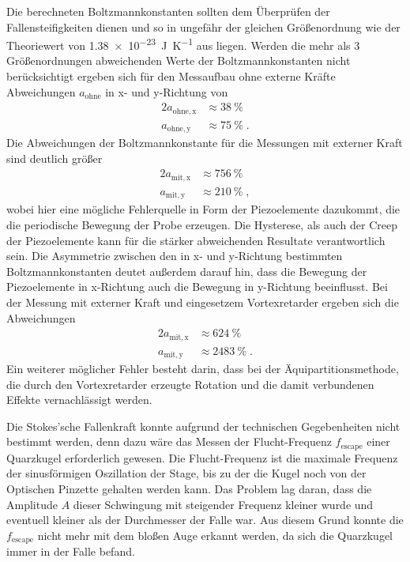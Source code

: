 Die berechneten Boltzmannkonstanten sollten dem Überprüfen der Fallensteifigkeiten dienen und so in ungefähr der gleichen Größenordnung wie der Theoriewert von \qty{1.38e-23}{\joule\per\kelvin} aus \cite{k_b} liegen.
Werden die mehr als 3 Größenordnungen abweichenden Werte der Boltzmannkonstanten nicht berücksichtigt ergeben sich für den Messaufbau ohne externe Kräfte Abweichungen $a_{\mathrm{ohne}}$ in x- und y-Richtung von
\begin{alignat*}{2}
    a_{\mathrm{ohne,x}} &\approx \qty{38}{\%} \\
    a_{\mathrm{ohne,y}} &\approx \qty{75}{\%} \;.
\end{alignat*}
Die Abweichungen der Boltzmannkonstante für die Messungen mit externer Kraft sind deutlich größer
\begin{alignat*}{2}
    a_{\mathrm{mit,x}} &\approx \qty{756}{\%} \\
    a_{\mathrm{mit,y}} &\approx \qty{210}{\%} \;,
\end{alignat*}
wobei hier eine mögliche Fehlerquelle in Form der Piezoelemente dazukommt, die die periodische Bewegung der Probe erzeugen.
Die Hysterese, als auch der Creep der Piezoelemente kann für die stärker abweichenden Resultate verantwortlich sein.
Die Asymmetrie zwischen den in x- und y-Richtung bestimmten Boltzmannkonstanten deutet außerdem darauf hin, dass die Bewegung der Piezoelemente in x-Richtung auch die Bewegung in y-Richtung beeinflusst.
Bei der Messung mit externer Kraft und eingesetzem Vortexretarder ergeben sich die Abweichungen
\begin{alignat*}{2}
    a_{\mathrm{mit,x}} &\approx \qty{624}{\%} \\
    a_{\mathrm{mit,y}} &\approx \qty{2483}{\%} \;.
\end{alignat*}
Ein weiterer möglicher Fehler besteht darin, dass bei der Äquipartitionsmethode, die durch den Vortexretarder erzeugte Rotation und die damit verbundenen Effekte vernachlässigt werden.

Die Stokes'sche Fallenkraft konnte aufgrund der technischen Gegebenheiten nicht bestimmt werden, denn dazu wäre das Messen der Flucht-Frequenz $f_{\mathrm{escape}}$ einer Quarzkugel erforderlich gewesen.
Die Flucht-Frequenz ist die maximale Frequenz der sinusförmigen Oszillation der Stage, bis zu der die Kugel noch von der Optischen Pinzette gehalten werden kann.
Das Problem lag daran, dass die Amplitude $A$ dieser Schwingung mit steigender Frequenz kleiner wurde und eventuell kleiner als der Durchmesser der Falle war.
Aus diesem Grund konnte die $f_{\mathrm{escape}}$ nicht mehr mit dem bloßen Auge erkannt werden, da sich die Quarzkugel immer in der Falle befand.


